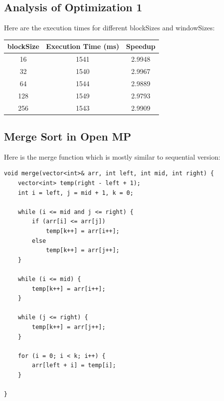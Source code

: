 \documentclass{article}
\begin{document}
\subsection*{Analysis of Optimization 1}
Here are the execution times for different blockSizes and windowSizes:

\begin{center}
  \begin{tabular}{|c|c|c|}
    \hline
    \textbf{blockSize} & \textbf{Execution Time (ms)} & \textbf{Speedup} \\
    \hline

    16 & 1541 & 2.9948 \\
    32 & 1540 & 2.9967 \\
    64 & 1544 & 2.9889 \\
    128 & 1549 & 2.9793 \\
    256 & 1543 & 2.9909 \\
    
    \hline
  \end{tabular}
\end{center}

\subsection*{Merge Sort in Open MP}
Here is the merge function which is mostly similar to sequential version:

\begin{lstlisting}
void merge(vector<int>& arr, int left, int mid, int right) {
    vector<int> temp(right - left + 1);
    int i = left, j = mid + 1, k = 0;
    
    while (i <= mid and j <= right) {
        if (arr[i] <= arr[j])
            temp[k++] = arr[i++];
        else
            temp[k++] = arr[j++];
    }
    
    while (i <= mid) {
        temp[k++] = arr[i++];
    }

    while (j <= right) {
        temp[k++] = arr[j++];
    }

    for (i = 0; i < k; i++) {
        arr[left + i] = temp[i];
    }
    
}
\end{lstlisting}
\end{document}
